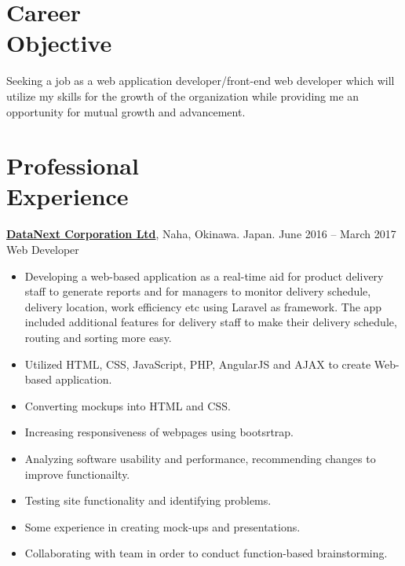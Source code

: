 \documentclass[margin,line]{res}
\begin{document}
\begin{resume} 
 


\section{Career \\Objective}

Seeking a job as a web application developer/front-end web developer which will utilize my skills for the growth of the organization while providing me an opportunity for mutual growth and advancement.

\section{Professional \\Experience}

\href{http://www.datanext.co.jp/en/}{\bf DataNext Corporation Ltd}, Naha, Okinawa. Japan. \hfill{June 2016 -- March 2017}\\
Web Developer
\begin{itemize} \itemsep -2pt  %
 \item Developing a web-based application as a real-time aid for product delivery staff to generate reports and for managers to monitor delivery schedule, delivery location, work efficiency etc using Laravel as framework.
 The app included additional features for delivery staff to make their delivery schedule, routing and sorting more easy.
 \item Utilized HTML, CSS, JavaScript, PHP, AngularJS and AJAX to create Web-based application. 
 \item Converting mockups into HTML and CSS.
 \item Increasing responsiveness of webpages using bootsrtrap.
 \item Analyzing software usability and performance, recommending changes to improve functionailty.
 \item Testing site functionality and identifying problems.
 \item Some experience in creating mock-ups and presentations.
 \item Collaborating with team in order to conduct function-based brainstorming. 


\end{itemize}
\end{resume}
\end{document}
